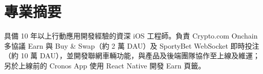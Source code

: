\section{專業摘要}
具備 10 年以上行動應用開發經驗的資深 iOS 工程師。負責 Crypto.com Onchain 多協議 Earn 與 Buy \& Swap（約 2 萬 DAU）及 SportyBet WebSocket 即時投注（約 10 萬 DAU），並開發聯網車輛功能，與產品及後端團隊協作至上線及維運；另於上線前的 Cronos App 使用 React Native 開發 Earn 頁籤。
